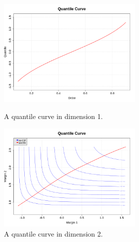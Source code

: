 \begin{figure}[H]
  \begin{minipage}{9cm}
    \begin{center}
      \includegraphics[width=7cm]{Figures/QuantileCurve2.png}
      \caption{A quantile curve in dimension 1.}
      \label{quantileCurve}
    \end{center}
  \end{minipage}
  \hfill
  \begin{minipage}{9cm}
    \begin{center}
      \includegraphics[width=7cm]{Figures/QuantileCurve.png}
      \caption{A quantile curve in dimension 2.}
      \label{quantileCurve2d}
    \end{center}
  \end{minipage}
\end{figure}
